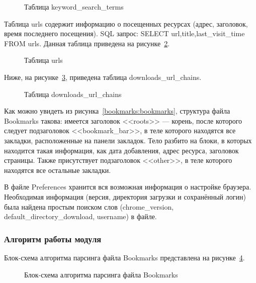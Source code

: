 \begin{figure}[h!]
\caption{Таблица keyword\_search\_terms}
\label{key:key}
\end{figure}

Таблица  urls содержит информацию о посещенных ресурсах (адрес, заголовок, время последнего посещения). SQL запрос: SELECT url,title,last\_visit\_time FROM urls. Данная таблица приведена на рисунке~\ref{urls:urls}.

\begin{figure}[h!]
\caption{Таблица urls}
\label{urls:urls}
\end{figure}

Ниже, на рисунке~\ref{chains:chains}, приведена таблица downloads\_url\_chains.

\begin{figure}[h!]
\caption{Таблица downloads\_url\_chains}
\label{chains:chains}
\end{figure}

Как можно увидеть из рисунка~\ref{bookmarks:bookmarks}, структура файла Bookmarks такова: имеется заголовок <<roots>> --- корень, после которого следует подзаголовок <<bookmark\_bar>>, в  теле которого находятся все закладки, расположенные на панели закладок. Тело разбито на блоки, в которых находится такая информация, как дата добавления, адрес ресурса, заголовок страницы. Также присутствует подзаголовок <<other>>, в теле которого находятся все остальные закладки.


В файле Preferences хранится вся возможная информация о настройке браузера. Необходимая информация (версия,  директория загрузки и сохранённый логин) была найдена простым поиском слов (chrome\_version, default\_directory\_download, username) в файле.

\subsubsection{Алгоритм работы модуля}

Блок-схема алгоритма парсинга файла Bookmarks представлена на рисунке~\ref{bookmarks_parsing:bookmarks_parsing}.

\begin{figure}[h!]
\caption{Блок-схема алгоритма парсинга файла Bookmarks}
\label{bookmarks_parsing:bookmarks_parsing}
\end{figure}

